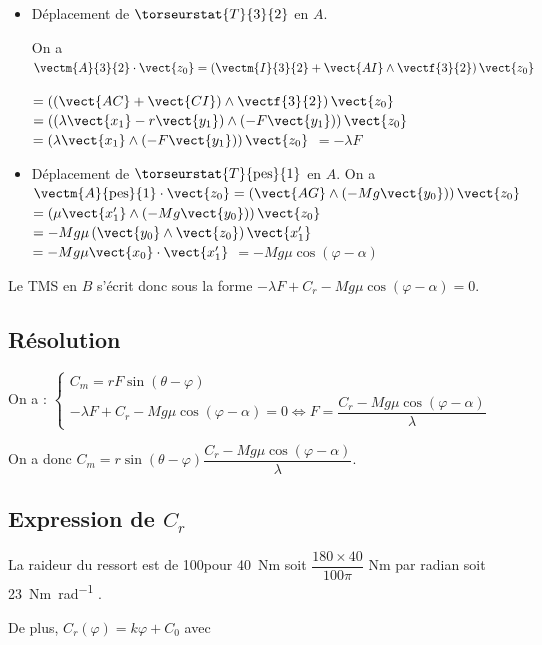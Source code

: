 \begin{itemize}
\item Déplacement de  $\torseurstat{T}{3}{2}$ en $A$.

On a $\vectm{A}{3}{2}\cdot\vect{z_0} =\left(\vectm{I}{3}{2}+\vect{AI}\wedge\vectf{3}{2}\right)\vect{z_0}$

$=\left(\left(\vect{AC}+\vect{CI}\right)\wedge\vectf{3}{2}\right)\vect{z_0}$
$=\left(\left(\lambda \vect{x_1}-r\vect{y_1}\right)\wedge\left(-F\vect{y_1}\right)\right)\vect{z_0}$
$=\left(\lambda \vect{x_1}\wedge\left(-F\vect{y_1}\right)\right)\vect{z_0}$
$=-\lambda F$

\item Déplacement de  $\torseurstat{T}{\text{pes}}{1}$ en $A$.
On a $\vectm{A}{\text{pes}}{1}\cdot\vect{z_0} =\left(\vect{AG}\wedge \left(-Mg\vect{y_0}\right)\right)\vect{z_0}$
$=\left(\mu \vect{x_1'}\wedge \left(-Mg\vect{y_0}\right)\right)\vect{z_0}$
$=-Mg \mu \left(\vect{y_0} \wedge \vect{z_0}\right)\vect{x_1'}$
$=-Mg \mu \vect{x_0}\cdot \vect{x_1'}$
$=-Mg \mu \cos\left( \varphi - \alpha \right)$
\end{itemize}

Le TMS en $B$ s'écrit donc sous la forme 
$-\lambda F + C_r-Mg \mu \cos\left( \varphi - \alpha \right) = 0$.

\subsection{Résolution}

On a :
$\left\{
\begin{array}{l}
C_m=rF\sin\left( \theta-\varphi\right) \\
-\lambda F + C_r-Mg \mu \cos\left( \varphi - \alpha \right) = 0 \Leftrightarrow  F=  \dfrac{C_r-Mg \mu \cos\left( \varphi - \alpha \right)}{\lambda} 
\end{array}
\right.
$

On a donc $C_m=r\sin\left( \theta-\varphi\right) \dfrac{C_r-Mg \mu \cos\left( \varphi - \alpha \right)}{\lambda} $.

\subsection{Expression de $C_r$}
La raideur du ressort est de 100\degres pour \SI{40}{Nm} soit $\dfrac{180\times 40}{100 \pi}$ Nm par radian soit \SI{23}{Nm.rad^{-1}} .

De plus, 
$C_r (\varphi) = k\varphi + C_0$
avec  

